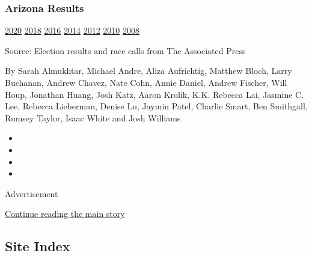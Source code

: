 \hypertarget{arizona-results}{%
\subsubsection{Arizona Results}\label{arizona-results}}

\href{https://www.nytimes.com/interactive/2020/08/04/us/elections/results-arizona-primary-elections.html?action=click\&module=ELEX_results\&pgtype=Interactive\&region=PastResultsFooter}{2020}
\href{https://www.nytimes.com/interactive/2018/11/06/us/elections/results-arizona-elections.html?action=click\&module=ELEX_results\&pgtype=Interactive\&region=PastResultsFooter}{2018}
\href{https://www.nytimes.com/elections/2016/results/arizona?action=click\&module=ELEX_results\&pgtype=Interactive\&region=PastResultsFooter}{2016}
\href{https://www.nytimes.com/elections/2014/arizona-elections?action=click\&module=ELEX_results\&pgtype=Interactive\&region=PastResultsFooter}{2014}
\href{https://www.nytimes.com/elections/2012/results/states/arizona.html?action=click\&module=ELEX_results\&pgtype=Interactive\&region=PastResultsFooter}{2012}
\href{https://www.nytimes.com/elections/2010/results/arizona.html?action=click\&module=ELEX_results\&pgtype=Interactive\&region=PastResultsFooter}{2010}
\href{https://www.nytimes.com/elections/2008/results/states/arizona.html?action=click\&module=ELEX_results\&pgtype=Interactive\&region=PastResultsFooter}{2008}

Source: Election results and race calls from The Associated Press

By Sarah Almukhtar, Michael Andre, Aliza Aufrichtig, Matthew Bloch,
Larry Buchanan, Andrew Chavez, Nate Cohn, Annie Daniel, Andrew Fischer,
Will Houp, Jonathan Huang, Josh Katz, Aaron Krolik, K.K. Rebecca Lai,
Jasmine C. Lee, Rebecca Lieberman, Denise Lu, Jaymin Patel, Charlie
Smart, Ben Smithgall, Rumsey Taylor, Isaac White and Josh Williams

\begin{itemize}
\item
\item
\item
\item
\end{itemize}

Advertisement

\protect\hyperlink{after-bottom}{Continue reading the main story}

\hypertarget{site-index}{%
\subsection{Site Index}\label{site-index}}

